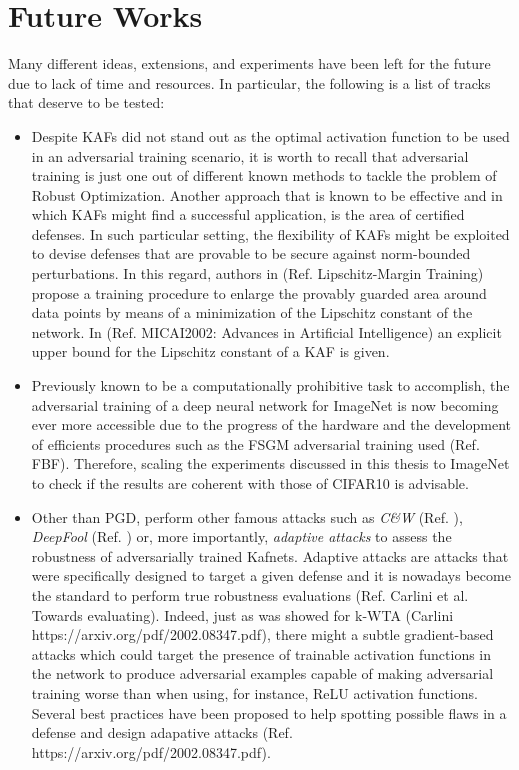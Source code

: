 \documentclass[LaM,binding=0.6cm]{./packages/sapthesis/sapthesis}
\begin{document}
        \section{Future Works}

        Many different ideas, extensions, and experiments have been left for the future due to lack of time and resources. In particular, the following is a list of tracks that deserve to be tested:
        \begin{itemize}
            \item Despite KAFs did not stand out as the optimal activation function to be used in an adversarial training scenario, it is worth to recall that adversarial training is just one 
            out of different known methods to tackle the problem of Robust Optimization. Another approach that is known to be effective and in which KAFs might find a successful
            application, is the area of certified defenses. In such particular setting, the flexibility of KAFs might be exploited to devise defenses that are provable to be secure against 
            norm-bounded perturbations. In this regard, authors in (Ref. Lipschitz-Margin Training) propose a training procedure to enlarge the provably guarded area around data points 
            by means of a minimization of the Lipschitz constant of the network. In (Ref. MICAI2002: Advances in Artificial Intelligence) an explicit upper bound for the Lipschitz
            constant of a KAF is given.

            \item Previously known to be a computationally prohibitive task to accomplish, the adversarial training of a deep neural network for ImageNet is now becoming ever more accessible 
                  due to the progress of the hardware and the development of efficients procedures such as the FSGM adversarial training used (Ref. FBF). Therefore, scaling the experiments discussed in this thesis
                  to ImageNet to check if the results are coherent with those of CIFAR10 is advisable. 

            \item Other than PGD, perform other famous attacks such as \textit{C\&W} (Ref. ), \textit{DeepFool} (Ref. ) or, more importantly, \textit{adaptive attacks} to assess the robustness of adversarially trained Kafnets. 
            Adaptive attacks are attacks that were specifically designed to target a given defense and it is nowadays become the standard to perform true robustness evaluations (Ref. Carlini et al. Towards evaluating).
            Indeed, just as was showed for k-WTA (Carlini https://arxiv.org/pdf/2002.08347.pdf), there might a subtle gradient-based attacks which could target the presence of trainable activation functions in the network 
            to produce adversarial examples capable of making adversarial training worse than when using, for instance, ReLU activation functions. Several best practices have been proposed to help spotting possible flaws 
            in a defense and design adapative attacks (Ref. https://arxiv.org/pdf/2002.08347.pdf).
        \end{itemize}
            

    
   
    
\appendix


\backmatter
\end{document}

